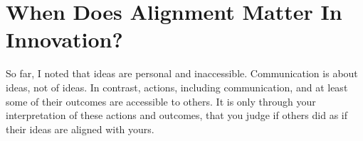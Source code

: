 \documentclass[graybox,envcountchap,sectrefs]{svmono}
\begin{document}
\begin{comment}
Could you, or anyone really claim to know exactly what Bruce Sprinsgsteen meant when he wrote the following part of his "Lost in the flood"?

\begin{quote}
"The ragamuffin gunner is returnin' home like a hungry runaway
He walks through town all alone--"He must be from the fort," he hears the high school girls say
His countryside's burnin' with wolfman fairies dressed in drag for homicide
The hit-and-run plead sanctuary, 'neath a holy stone they hide
They're breakin' beams and crosses with a spastic's reelin' perfection
Nuns run bald through Vatican halls, pregnant, pleadin' immaculate conception
And everybody's wrecked on Main Street from drinking unholy blood
Sticker smiles sweet as Gunner breathes deep, his ankles caked in mud
And I said, 'Hey, gunner man, that's qucksand, that's quicksand, that ain't mud
Have you thrown your senses to the war, or did you lose them in the flood?'" \cite{wikipedia-lost-in-the-flood}
\end{quote}

Your ideas about his ideas are typically called your interpretations of the meaning he intended. Aren't they speculations? You are trying to make sense, using what you think, feel, intend, and so on, at some time (now?) about what someone else was thinking, feeling, intending, a long time ago - sometime before or in 1973 for that song. Best of all, you do this only on the basis of signals that you get from communication with him. In the case of the song, you listen to it, and that's most of us have, unless you have a chance to talk with Bruce. 

This struggle with meaning should be obvious. Don't you know the feeling of trying to get someone to understand something? You often think you failed: they are not doing what you thought they would, and, you think, it must be that you were not clear and convincing.

For that song, the struggle with meaning is not a major issue \footnote{Many heard that song, but only a few go so far as to share their interpretations and claim to be right. For them, the stakes are higher \cite{songmeanings-lost-in-the-flood}.}. There is not much at stake.
\end{comment}


\section{When Does Alignment Matter In Innovation?}
\label{c1-s8}
So far, I noted that ideas are personal and inaccessible. Communication is about ideas, not of ideas. In contrast, actions, including communication, and at least some of their outcomes are accessible to others. It is only through your interpretation of these actions and outcomes, that you judge if others did as if their ideas are aligned with yours.
\end{document}
